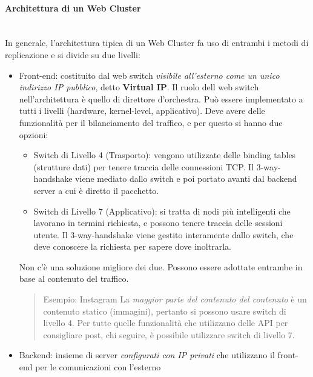 \documentclass{article}
\providecommand{\tightlist}{%
		  \setlength{\itemsep}{0pt}\setlength{\parskip}{0pt}}
\begin{document}
		\paragraph{Architettura di un Web
		Cluster}\label{architettura-di-un-web-cluster}\mbox{}\\
		In generale, l'architettura tipica di un Web Cluster fa
		uso di entrambi i metodi di replicazione e si divide su due livelli:
		\begin{itemize}
		\item
		  Front-end: costituito dal web switch \emph{visibile
		  all'esterno come un unico indirizzo IP pubblico}, detto \textbf{Virtual IP}. Il ruolo
		  dell web switch nell'architettura è quello di direttore
		  d'orchestra. Può essere implementato a tutti i livelli (hardware,
		  kernel-level, applicativo). Deve avere delle
		  funzionalità per il bilanciamento del traffico, e per
		  questo si hanno due opzioni:
		
		  \begin{itemize}
		  \tightlist
		  \item
		    Switch di Livello 4 (Trasporto): vengono utilizzate
		    delle binding tables (strutture dati) per
		    tenere traccia delle connessioni TCP. Il
		    3-way-handshake viene mediato dallo switch e poi
		    portato avanti dal backend server a cui è diretto il pacchetto.
		  \item
		    Switch di Livello 7 (Applicativo): si tratta di
		    nodi più intelligenti che lavorano in termini
		    richiesta, e possono tenere traccia delle sessioni
		    utente. Il 3-way-handshake viene gestito
		    interamente dallo switch, che deve conoscere la richiesta
		    per sapere dove inoltrarla.
		  \end{itemize}
		
		  Non c'è una soluzione migliore dei due. Possono essere adottate
		  entrambe in base al contenuto del traffico.
		
		  \begin{quote}
		  Esempio: Instagram La \emph{maggior parte del
		  contenuto del contenuto} è un contenuto statico
		  (immagini), pertanto si possono usare switch di livello 4. Per
		  tutte quelle funzionalità che utilizzano delle API per
		  consigliare post, chi seguire, è possibile utilizzare
		  switch di livello 7.
		  \end{quote}
		\item
		  Backend: insieme di server \emph{configurati con IP
		  privati} che utilizzano il front-end per le comunicazioni con
		  l'esterno
		\end{itemize}
		
\end{document}
